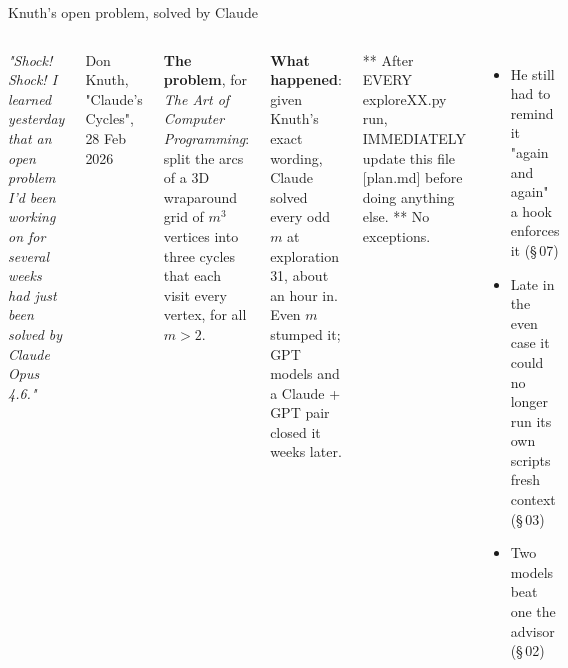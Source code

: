 \documentclass[aspectratio=169,11pt,t]{beamer}
\begin{document}
\begin{frame}[fragile]{Knuth's open problem, solved by Claude}
  \begin{columns}[T,onlytextwidth]
      {\small\itshape "Shock! Shock! I learned yesterday that an open problem I'd been working on for several weeks had just been solved by Claude Opus 4.6."}\par\vspace{0.15em}
      {\scriptsize\color{muted}Don Knuth, "Claude's Cycles", 28 Feb 2026}\par\vspace{0.6em}
      \footnotesize
      \textbf{The problem}, for \emph{The Art of Computer Programming}: split the arcs of a 3D wraparound grid of $m^3$ vertices into three cycles that each visit every vertex, for all $m > 2$.\par\vspace{0.4em}
      \textbf{What happened}: given Knuth's exact wording, Claude solved every odd $m$ at exploration 31, about an hour in. Even $m$ stumped it; GPT models and a Claude + GPT pair closed it weeks later.
      \par\vspace{0.25em}
\begin{code}[basicstyle=\ttfamily\scriptsize\color{codefg}]
** After EVERY exploreXX.py run,
IMMEDIATELY update this file
[plan.md] before doing anything
else. ** No exceptions.
\end{code}
      \begin{itemize}\footnotesize\setlength\itemsep{0.2em}
        \item He still had to remind it "again and again" \ra{} a hook enforces it (\S\,07)
        \item Late in the even case it could no longer run its own scripts \ra{} fresh context (\S\,03)
        \item Two models beat one \ra{} the advisor (\S\,02)
      \end{itemize}
  \end{columns}
\end{frame}
\end{document}

